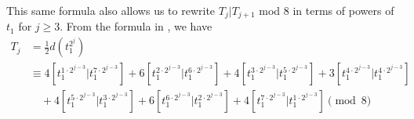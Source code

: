 \begin{exm} \label{exm:tjtj1mod8}
This same formula also allows us to rewrite $T_j|T_{j+1}$ mod $8$ in terms of powers of $t_1$ for $j \geq 3$. From the formula in , we have
 \begin{align*}
T_j & = \frac{1}{2} d(t_1^{2^{j}}) \\
&\equiv 4[t_1^{1 \cdot 2^{j-3}} | t_1^{7 \cdot 2^{j-3}}] + 6[t_1^{2 \cdot 2^{j-3}} | t_1^{6 \cdot 2^{j-3}}] + 4[t_1^{3 \cdot 2^{j-3}} | t_1^{5 \cdot 2^{j-3}}] + 3[t_1^{4 \cdot 2^{j-3}} | t_1^{4 \cdot 2^{j-3}}] \\
                 &\quad + 4[t_1^{5 \cdot 2^{j-3}} | t_1^{3 \cdot 2^{j-3}}] + 6[t_1^{6 \cdot 2^{j-3}} | t_1^{2 \cdot 2^{j-3}}] + 4[t_1^{7 \cdot 2^{j-3}} | t_1^{1 \cdot 2^{j-3}}]  \pmod{8}
     \end{align*}             
                 

\end{exm}
